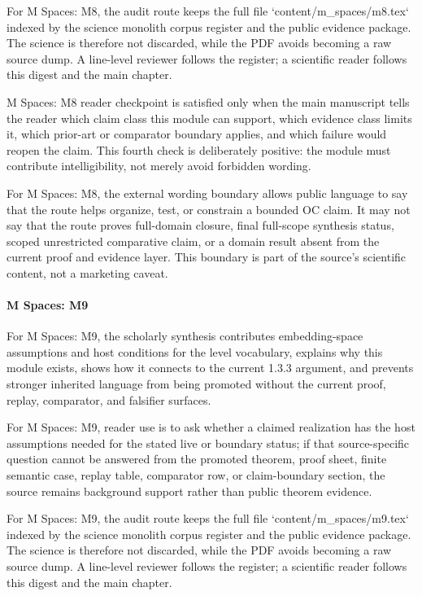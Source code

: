 For M Spaces: M8, the audit route keeps the full file `content/m\_spaces/m8.tex` indexed by the science monolith corpus register and the public evidence package. The science is therefore not discarded, while the PDF avoids becoming a raw source dump. A line-level reviewer follows the register; a scientific reader follows this digest and the main chapter.


M Spaces: M8 reader checkpoint is satisfied only when the main manuscript tells the reader which claim class this module can support, which evidence class limits it, which prior-art or comparator boundary applies, and which failure would reopen the claim. This fourth check is deliberately positive: the module must contribute intelligibility, not merely avoid forbidden wording.


For M Spaces: M8, the external wording boundary allows public language to say that the route helps organize, test, or constrain a bounded OC claim. It may not say that the route proves full-domain closure, final full-scope synthesis status, scoped unrestricted comparative claim, or a domain result absent from the current proof and evidence layer. This boundary is part of the source's scientific content, not a marketing caveat.


\paragraph{M Spaces: M9}

For M Spaces: M9, the scholarly synthesis contributes embedding-space assumptions and host conditions for the level vocabulary, explains why this module exists, shows how it connects to the current 1.3.3 argument, and prevents stronger inherited language from being promoted without the current proof, replay, comparator, and falsifier surfaces.


For M Spaces: M9, reader use is to ask whether a claimed realization has the host assumptions needed for the stated live or boundary status; if that source-specific question cannot be answered from the promoted theorem, proof sheet, finite semantic case, replay table, comparator row, or claim-boundary section, the source remains background support rather than public theorem evidence.


For M Spaces: M9, the audit route keeps the full file `content/m\_spaces/m9.tex` indexed by the science monolith corpus register and the public evidence package. The science is therefore not discarded, while the PDF avoids becoming a raw source dump. A line-level reviewer follows the register; a scientific reader follows this digest and the main chapter.


